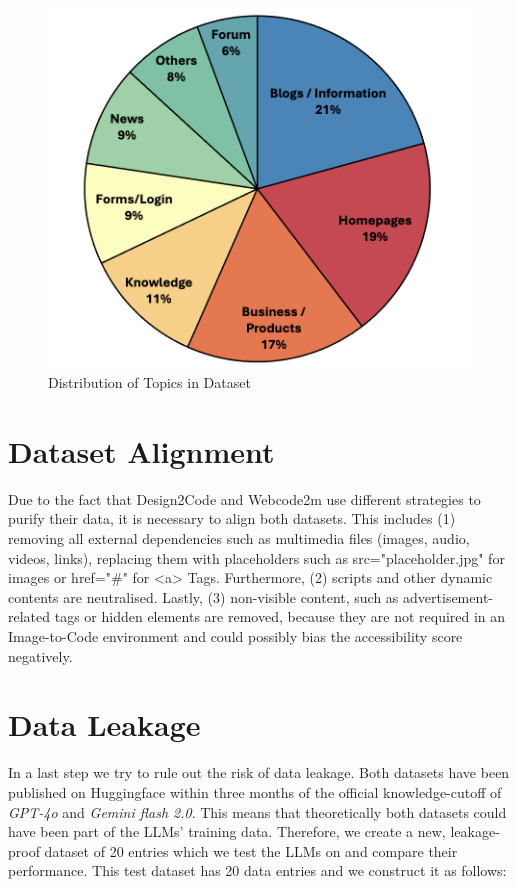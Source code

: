 \begin{figure}[p]
  \centering
  \includegraphics[width=\textwidth]{figures/dataset_distribution.png}
  \caption{Distribution of Topics in Dataset}
  \label{fig:dataset_distribution}
\end{figure}

\section{Dataset Alignment}
Due to the fact that Design2Code and Webcode2m use different strategies to purify
their data, it is necessary to align both datasets.
This includes (1) removing all external dependencies such as multimedia files (images, 
audio, videos, links), replacing them with placeholders such as src="placeholder.jpg" 
for images or href="\#" for <a> Tags. Furthermore, (2) scripts and other dynamic 
contents are neutralised.
Lastly, (3) non-visible content, such as advertisement-related tags or hidden elements 
are removed, because they are not required in an Image-to-Code environment and 
could possibly bias the accessibility score negatively.


\section{Data Leakage}
In a last step we try to rule out the risk of data leakage. Both datasets have been
published on Huggingface within three months of the official knowledge-cutoff 
of \textit{GPT-4o} and \textit{Gemini flash 2.0}.
This means that theoretically both datasets could have been part of the LLMs' training
data.
Therefore, we create a 
new, leakage-proof dataset of 20 entries which we test the LLMs on and compare their 
performance.
This test dataset has 20 data entries and we construct it as follows:


